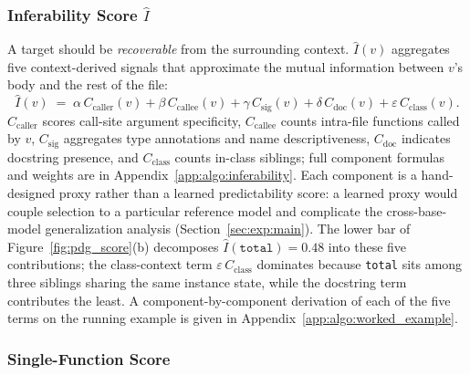 \subsubsection{Inferability Score $\hat{I}$}
\label{sec:method:inferability}

A target should be \emph{recoverable} from the surrounding context.
$\hat{I}(v)$ aggregates five context-derived signals that approximate the
mutual information between $v$'s body and the rest of the file:
%
\begin{equation}
  \hat{I}(v) \;=\; \alpha\,C_{\mathrm{caller}}(v)
              + \beta\,C_{\mathrm{callee}}(v)
              + \gamma\,C_{\mathrm{sig}}(v)
              + \delta\,C_{\mathrm{doc}}(v)
              + \varepsilon\,C_{\mathrm{class}}(v).
  \label{eq:inferability}
\end{equation}
%
$C_{\mathrm{caller}}$ scores call-site argument specificity,
$C_{\mathrm{callee}}$ counts intra-file functions called by $v$,
$C_{\mathrm{sig}}$ aggregates type annotations and name descriptiveness,
$C_{\mathrm{doc}}$ indicates docstring presence, and
$C_{\mathrm{class}}$ counts in-class siblings; full component formulas
and weights are in Appendix~\ref{app:algo:inferability}. Each component
is a hand-designed proxy rather than a learned predictability score: a
learned proxy would couple selection to a particular reference model and
complicate the cross-base-model generalization analysis
(Section~\ref{sec:exp:main}). The lower bar of
Figure~\ref{fig:pdg_score}(b) decomposes
$\hat{I}(\texttt{total})\!=\!0.48$ into these five contributions; the
class-context term $\varepsilon\,C_{\mathrm{class}}$ dominates because
\texttt{total} sits among three siblings sharing the same instance
state, while the docstring term contributes the least.
A component-by-component derivation of each of the five terms on the
running example is given in Appendix~\ref{app:algo:worked_example}.

\subsubsection{Single-Function Score}
\label{sec:method:single}

